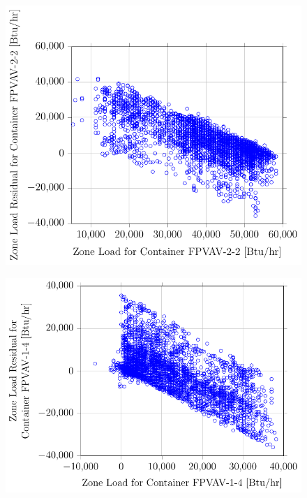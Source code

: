 \begin{figure}
\centering
\includegraphics[]{Plots/2016-09-14-1028-ZoneLoadResidualforContainerFPVAV22vsZoneLoadforContainerFPVAV22.pdf}
\caption{}
\label{fig:2016-09-14-1028-ZoneLoadResidualforContainerFPVAV22vsZoneLoadforContainerFPVAV22}
\end{figure}

\begin{figure}
\centering
\includegraphics[]{Plots/2016-09-14-1007-ZoneLoadResidualforContainerFPVAV14vsZoneLoadforContainerFPVAV14.pdf}
\caption{}
\label{fig:2016-09-14-1007-ZoneLoadResidualforContainerFPVAV14vsZoneLoadforContainerFPVAV14}
\end{figure}

